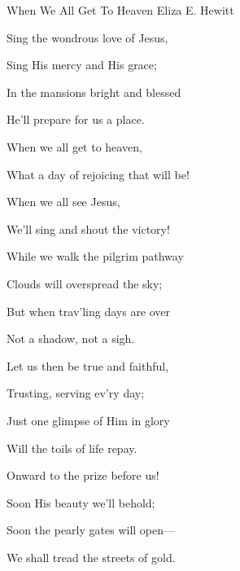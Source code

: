 \documentclass[12pt]{book}
\begin{document}
\begin{song}{When We All Get To Heaven}{}
  {\SBPubDom}
  {Eliza E. Hewitt}
  {}
  {}

  \begin{SBVerse}
    Sing the wondrous love of Jesus,

    Sing His mercy and His grace;

    In the mansions bright and blessed

    He'll prepare for us a place.
  \end{SBVerse}

  \begin{SBOpGroup}
    When we all get to heaven,

    What a day of rejoicing that will be!

    When we all see Jesus,

    We'll sing and shout the victory!
  \end{SBOpGroup}

  \begin{SBVerse}
    While we walk the pilgrim pathway

    Clouds will overspread the sky;

    But when trav'ling days are over

    Not a shadow, not a sigh.
  \end{SBVerse}

  \begin{SBVerse}
    Let us then be true and faithful,

    Trusting, serving ev'ry day;

    Just one glimpse of Him in glory

    Will the toils of life repay.
  \end{SBVerse}

  \begin{SBVerse}
    Onward to the prize before us!

    Soon His beauty we'll behold;

    Soon the pearly gates will open---

    We shall tread the streets of gold.
  \end{SBVerse}
\end{song}
\end{document}
